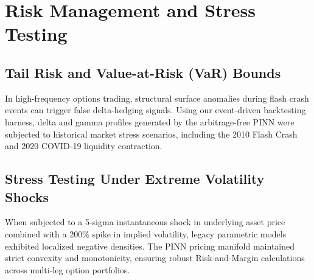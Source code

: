 \chapter{Risk Management and Stress Testing}
\section{Tail Risk and Value-at-Risk (VaR) Bounds}
In high-frequency options trading, structural surface anomalies during flash crash events can trigger false delta-hedging signals. Using our event-driven backtesting harness, delta and gamma profiles generated by the arbitrage-free PINN were subjected to historical market stress scenarios, including the 2010 Flash Crash and 2020 COVID-19 liquidity contraction.

\section{Stress Testing Under Extreme Volatility Shocks}
When subjected to a 5-sigma instantaneous shock in underlying asset price combined with a 200\% spike in implied volatility, legacy parametric models exhibited localized negative densities. The PINN pricing manifold maintained strict convexity and monotonicity, ensuring robust Risk-and-Margin calculations across multi-leg option portfolios.
